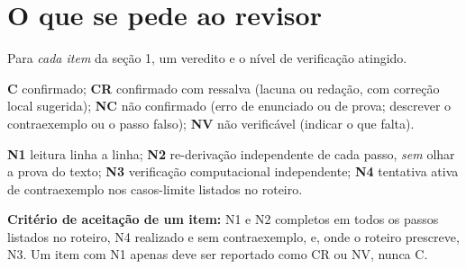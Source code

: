 \documentclass[11pt,a4paper]{article}
\newcommand{\blk}[1]{\textbf{#1}}
\begin{document}
\section{O que se pede ao revisor}
Para \emph{cada item} da seção 1, um veredito e o nível de verificação atingido.
\begin{description}[leftmargin=2.4em,style=nextline]
\item[Vereditos.] \textbf{C} confirmado; \textbf{CR} confirmado com ressalva (lacuna ou redação, com correção local sugerida); \textbf{NC} não confirmado (erro de enunciado ou de prova; descrever o contraexemplo ou o passo falso); \textbf{NV} não verificável (indicar o que falta).
\item[Níveis.] \textbf{N1} leitura linha a linha; \textbf{N2} re-derivação independente de cada passo, \emph{sem} olhar a prova do texto; \textbf{N3} verificação computacional independente; \textbf{N4} tentativa ativa de contraexemplo nos casos-limite listados no roteiro.
\end{description}
\blk{Critério de aceitação de um item:} N1 e N2 completos em todos os passos listados no roteiro, N4 realizado e sem contraexemplo, e, onde o roteiro prescreve, N3. Um item com N1 apenas deve ser reportado como CR ou NV, nunca C.
\end{document}

